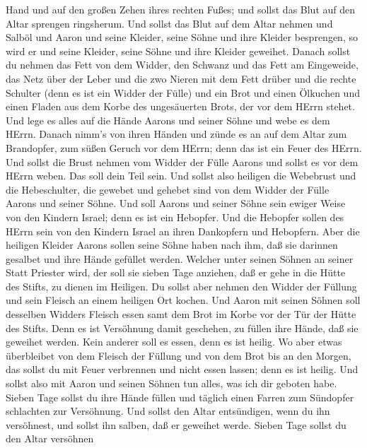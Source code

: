 Hand und auf den großen Zehen ihres rechten Fußes; und sollst das Blut
auf den Altar sprengen ringsherum.  Und sollst das Blut auf
dem Altar nehmen und Salböl und Aaron und seine Kleider, seine Söhne und
ihre Kleider besprengen, so wird er und seine Kleider, seine Söhne und
ihre Kleider geweihet.  Danach sollst du nehmen das Fett
von dem Widder, den Schwanz und das Fett am Eingeweide, das Netz über
der Leber und die zwo Nieren mit dem Fett drüber und die rechte Schulter
(denn es ist ein Widder der Fülle)  und ein Brot und einen
Ölkuchen und einen Fladen aus dem Korbe des ungesäuerten Brots, der vor
dem HErrn stehet.  Und lege es alles auf die Hände Aarons
und seiner Söhne und webe es dem HErrn.  Danach nimm's von
ihren Händen und zünde es an auf dem Altar zum Brandopfer, zum süßen
Geruch vor dem HErrn; denn das ist ein Feuer des HErrn. 
Und sollst die Brust nehmen vom Widder der Fülle Aarons und sollst es
vor dem HErrn weben. Das soll dein Teil sein.  Und sollst
also heiligen die Webebrust und die Hebeschulter, die gewebet und
gehebet sind von dem Widder der Fülle Aarons und seiner Söhne.
 Und soll Aarons und seiner Söhne sein ewiger Weise von den
Kindern Israel; denn es ist ein Hebopfer. Und die Hebopfer sollen des
HErrn sein von den Kindern Israel an ihren Dankopfern und Hebopfern.
 Aber die heiligen Kleider Aarons sollen seine Söhne haben
nach ihm, daß sie darinnen gesalbet und ihre Hände gefüllet werden.
 Welcher unter seinen Söhnen an seiner Statt Priester wird,
der soll sie sieben Tage anziehen, daß er gehe in die Hütte des Stifts,
zu dienen im Heiligen.  Du sollst aber nehmen den Widder
der Füllung und sein Fleisch an einem heiligen Ort kochen. 
Und Aaron mit seinen Söhnen soll desselben Widders Fleisch essen samt
dem Brot im Korbe vor der Tür der Hütte des Stifts.  Denn
es ist Versöhnung damit geschehen, zu füllen ihre Hände, daß sie
geweihet werden. Kein anderer soll es essen, denn es ist heilig.
 Wo aber etwas überbleibet von dem Fleisch der Füllung und
von dem Brot bis an den Morgen, das sollst du mit Feuer verbrennen und
nicht essen lassen; denn es ist heilig.  Und sollst also
mit Aaron und seinen Söhnen tun alles, was ich dir geboten habe. Sieben
Tage sollst du ihre Hände füllen  und täglich einen Farren
zum Sündopfer schlachten zur Versöhnung. Und sollst den Altar
entsündigen, wenn du ihn versöhnest, und sollst ihn salben, daß er
geweihet werde.  Sieben Tage sollst du den Altar versöhnen
